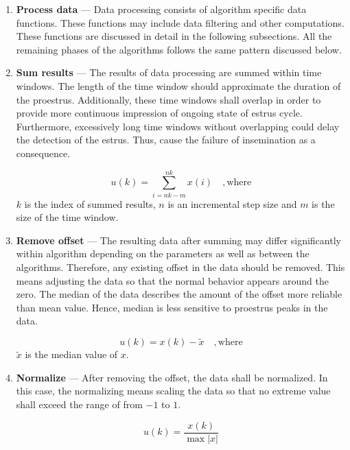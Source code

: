 \documentclass[english,12pt,a4paper,pdftex,elec,utf8]{aaltothesis}
\begin{document}
\begin{enumerate}

\item \textbf{Process data} --- Data processing consists of algorithm specific data functions. These functions may include data filtering and other computations. These functions are discussed in detail in the following subsections. All the remaining phases of the algorithms follows the same pattern discussed below. 

\item \textbf{Sum results} --- The results of data processing are summed within time windows. The length of the time window should approximate the duration of the proestrus. Additionally, these time windows shall overlap in order to provide more continuous impression of ongoing state of estrus cycle. Furthermore, excessively long time windows without overlapping could delay the detection of the estrus. Thus, cause the failure of insemination as a consequence. 

\begin{equation}
u(k) =\sum\limits^{nk}_{i = nk - m} x(i) \mathrm{\hspace{1em}, where}
\end{equation}
$k$ is the index of summed results, $n$ is an incremental step size and $m$ is the size of the time window.

\item \textbf{Remove offset} --- The resulting data after summing may differ significantly within algorithm depending on the parameters as well as between the algorithms. Therefore, any existing offset in the data should be removed. This means adjusting the data so that the normal behavior appears around the zero. The median of the data describes the amount of the offset more reliable than mean value. Hence, median is less sensitive to proestrus peaks in the data.  

\begin{equation}
u(k) = x(k) - \tilde{x} \mathrm{\hspace{1em}, where}
\end{equation}
$\tilde{x}$ is the median value of $x$.

\item \textbf{Normalize} --- After removing the offset, the data shall be normalized. In this case, the normalizing means scaling the data so that no extreme value shall exceed the range of from $-1$ to $1$.

\begin{equation}
u(k) = \frac{x(k)}{\max  \left| x \right|} 
\end{equation}



\end{enumerate}
\end{document}
